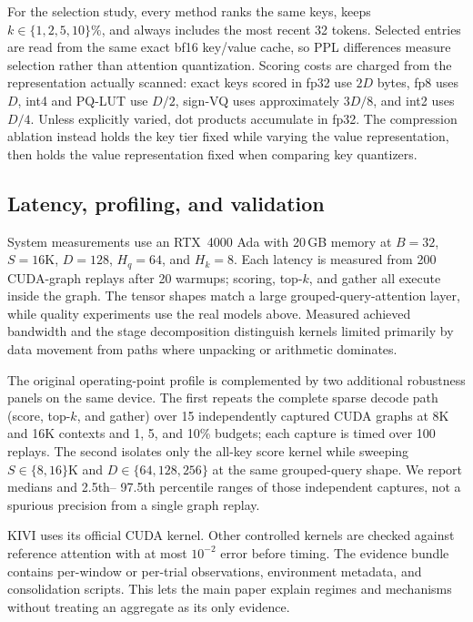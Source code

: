 \documentclass[sigplan,anonymous,review,nonacm]{acmart}
\begin{document}
For the selection study, every method ranks the same keys, keeps
$k\in\{1,2,5,10\}\%$, and always includes the most recent 32 tokens. Selected
entries are read from the same exact bf16 key/value cache, so PPL differences measure
selection rather than attention quantization. Scoring costs are charged from the
representation actually scanned: exact keys scored in fp32 use $2D$ bytes, fp8 uses $D$, int4
and PQ-LUT use $D/2$, sign-VQ uses approximately $3D/8$, and int2 uses $D/4$.
Unless explicitly varied, dot products accumulate in fp32. The compression ablation
instead holds the key tier fixed while varying the value representation, then holds
the value representation fixed when comparing key quantizers.

\subsection{Latency, profiling, and validation}
System measurements use an RTX~4000 Ada with 20\,GB memory at $B{=}32$,
$S{=}16$K, $D{=}128$, $H_q{=}64$, and $H_k{=}8$. Each latency is measured from
200 CUDA-graph replays after 20 warmups; scoring, top-$k$, and gather all execute
inside the graph. The tensor shapes match a large grouped-query-attention layer, while
quality experiments use the real models above. Measured achieved bandwidth and the
stage decomposition distinguish kernels limited primarily by data movement from paths
where unpacking or arithmetic dominates.

The original operating-point profile is complemented by two additional robustness
panels on the same device. The first repeats the complete sparse decode path (score,
top-$k$, and gather) over 15 independently captured CUDA graphs at 8K and 16K
contexts and 1, 5, and 10\% budgets; each capture is timed over 100 replays. The
second isolates only the all-key score kernel while sweeping $S\in\{8,16\}$K and
$D\in\{64,128,256\}$ at the same grouped-query shape. We report medians and 2.5th--
97.5th percentile ranges of those independent captures, not a spurious precision from
a single graph replay.

KIVI uses its official CUDA kernel. Other controlled kernels are checked against
reference attention with at most $10^{-2}$ error before timing. The evidence bundle
contains per-window or per-trial observations, environment metadata, and
consolidation scripts. This lets the main paper explain regimes and mechanisms without
treating an aggregate as its only evidence.

\end{document}
